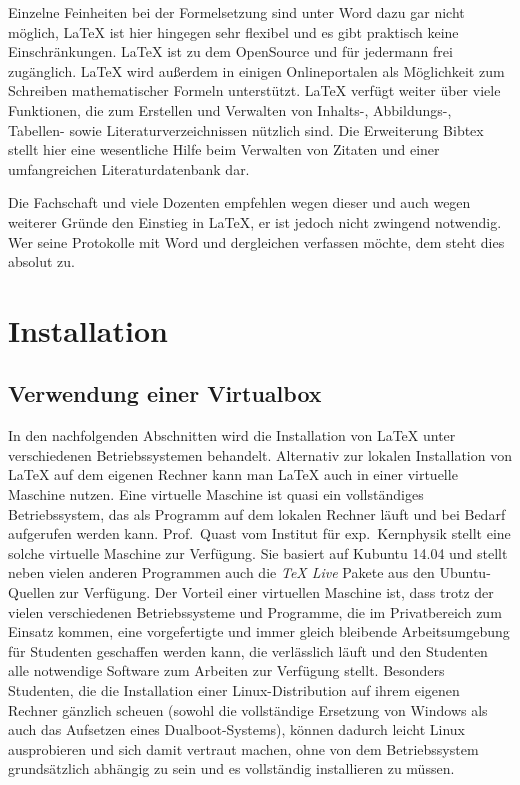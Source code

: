 Einzelne Feinheiten bei der Formelsetzung sind unter Word dazu gar nicht 
möglich, LaTeX ist hier hingegen sehr flexibel und es gibt praktisch keine 
Einschränkungen. LaTeX ist zu dem OpenSource und für jedermann frei zugänglich. 
LaTeX wird außerdem in einigen Onlineportalen als Möglichkeit zum Schreiben 
mathematischer Formeln unterstützt. LaTeX verfügt weiter über viele Funktionen, 
die zum Erstellen und Verwalten von Inhalts-, Abbildungs-, Tabellen- sowie 
Literaturverzeichnissen nützlich sind. Die Erweiterung Bibtex stellt hier eine 
wesentliche Hilfe beim Verwalten von Zitaten und einer umfangreichen 
Literaturdatenbank dar.

Die Fachschaft und viele Dozenten empfehlen wegen dieser und auch wegen weiterer 
Gründe den Einstieg in LaTeX, er ist jedoch nicht zwingend notwendig. Wer seine 
Protokolle mit Word und dergleichen verfassen möchte, dem steht dies absolut zu.

\section{Installation}
\subsection{Verwendung einer Virtualbox}
In den nachfolgenden Abschnitten wird die Installation von LaTeX unter 
verschiedenen Betriebssystemen behandelt. Alternativ zur lokalen Installation 
von LaTeX auf dem eigenen Rechner kann man LaTeX auch in einer virtuelle 
Maschine nutzen. Eine virtuelle Maschine ist quasi ein vollständiges 
Betriebssystem, das als Programm auf dem lokalen Rechner läuft und bei Bedarf 
aufgerufen werden kann. Prof.~Quast vom Institut für exp.~Kernphysik stellt eine 
solche virtuelle Maschine zur Verfügung. Sie basiert auf Kubuntu 14.04 und 
stellt neben vielen anderen Programmen auch die \textit{TeX Live} Pakete aus den 
Ubuntu-Quellen zur Verfügung. Der Vorteil einer virtuellen Maschine ist, dass 
trotz der vielen verschiedenen Betriebssysteme und Programme, die im 
Privatbereich zum Einsatz kommen, eine vorgefertigte und immer gleich bleibende 
Arbeitsumgebung für Studenten geschaffen werden kann, die verlässlich läuft und 
den Studenten alle notwendige Software zum Arbeiten zur Verfügung stellt. 
Besonders Studenten, die die Installation einer Linux-Distribution auf ihrem 
eigenen Rechner gänzlich scheuen (sowohl die vollständige Ersetzung von Windows 
als auch das Aufsetzen eines Dualboot-Systems), können dadurch leicht Linux 
ausprobieren und sich damit vertraut machen, ohne von dem Betriebssystem 
grundsätzlich abhängig zu sein und es vollständig installieren zu müssen.

